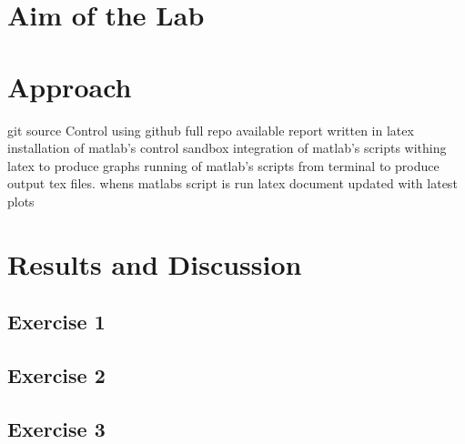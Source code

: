 \documentclass[12pt]{article}
\begin{document}



\pagebreak

\tableofcontents



\pagebreak

\section{Aim of the Lab}\label{sec:aim}

\pagebreak

\section{Approach}\label{sec:approach}

git source Control using github full repo available
report written in latex
installation of matlab's control sandbox
integration of matlab's scripts withing latex to produce graphs 
running of matlab's scripts from terminal to produce output tex files. whens matlabs script is run latex document updated with latest plots

\pagebreak
\section{Results and Discussion}\label{sec:results}

\subsection{Exercise 1}\label{sec:ex1}


\subsection{Exercise 2}\label{sec:ex2}

\subsection{Exercise 3}\label{sec:ex3}

\end{document}
